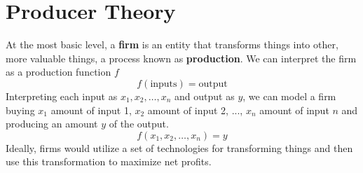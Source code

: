 \documentclass{article}
\begin{document}
\section{Producer Theory}

  \begin{definition}
    At the most basic level, a \textbf{firm} is an entity that transforms things into other, more valuable things, a process known as \textbf{production}. We can interpret the firm as a production function $f$ 
    \[f(\text{inputs}) = \text{output}\]
    Interpreting each input as $x_1, x_2, \ldots, x_n$ and output as $y$, we can model a firm buying $x_1$ amount of input 1, $x_2$ amount of input 2, ..., $x_n$ amount of input $n$ and producing an amount $y$ of the output. 
    \[f(x_1, x_2, \ldots, x_n) = y\]
    Ideally, firms would utilize a set of technologies for transforming things and then use this transformation to maximize net profits. 
  \end{definition}
\end{document}
